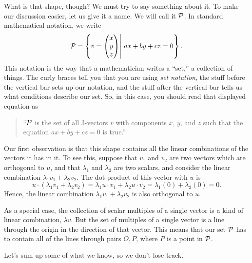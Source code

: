 \documentclass[00-livre-main.tex]{subfiles}
\begin{document}
What is that shape, though? We must try to say something about it. To make our discussion easier, let us give it a name. We will call it $\mathcal{P}$. In standard mathematical notation, we write
\[
\mathcal{P} = \left\{ v = \begin{pmatrix} x \\ y \\z \end{pmatrix} \middle| \ ax+by+cz=0\right\}.
\]
This notation is the way that a mathematician writes a ``set,'' a collection of things. The curly braces tell you that you are using \emph{set notation}, the stuff before the 
vertical bar sets up our notation, and the stuff after the vertical bar tells us what conditions describe our set. So, in this case, you should read that displayed equation as

\begin{quote}
``$\mathcal{P}$ is the set of all $3$-vectors $v$ with components $x$, $y$, and $z$ such that the equation $ax+by+cz=0$ is true.''
\end{quote}

Our first observation is that this shape contains all the linear combinations of the vectors it has in it. To see this, suppose that $v_1$ and $v_2$ are two vectors which are orthogonal to $u$, and that $\lambda_1$ and $\lambda_2$ are two scalars, and consider the linear combination
$\lambda_1 v_1 + \lambda_2 v_2$. The dot product of this vector with $u$ is
\[
u \cdot (\lambda_1 v_1 + \lambda_2 v_2) = \lambda_1 u\cdot v_1 + \lambda_2 u\cdot v_2 = \lambda_1 (0) + \lambda_2 (0) = 0.
\]
Hence, the linear combination $\lambda_1 v_1 + \lambda_2 v_2$ is also orthogonal to $u$.

As a special case, the collection of scalar multiples of a single vector is a kind of linear combination, $\lambda v$. But the set of multiples of a single vector is a line through the origin in the direction of that vector. This means that our set $\mathcal{P}$ has to contain all of the lines through pairs $O, P$, where $P$ is a point in $\mathcal{P}$.

Let's sum up some of what we know, so we don't lose track.
\end{document}
